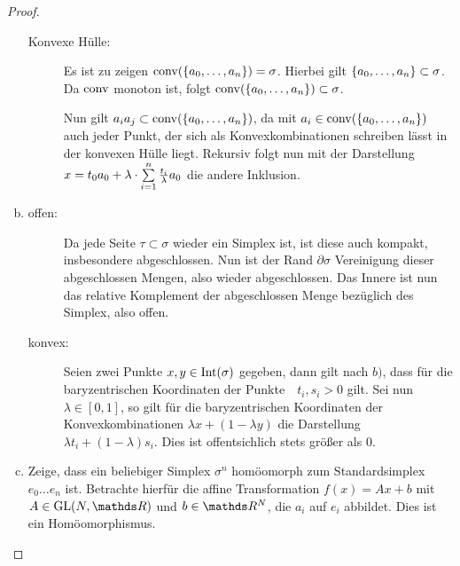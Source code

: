 \begin{Satz}
\begin{proof}
\begin{enumerate}[(a):]
\begin{description}
      \item[Konvexe Hülle:] Es ist zu zeigen
        $\conv(\sset{a_0,\ldots , a_n}) = \sigma$. Hierbei gilt
        $\sset{a_0,\ldots,a_n} \subset \sigma$. Da $\conv$ monoton
        ist, folgt $\conv(\sset{a_0,\ldots , a_n}) \subset \sigma$.
        
        Nun gilt $a_ia_j \subset \conv( \sset{a_0,\ldots , a_n} )$, da
        mit $a_i \in \ch$ auch jeder Punkt, der sich als
        Konvexkombinationen schreiben lässt in der konvexen Hülle
        liegt. Rekursiv folgt nun mit der Darstellung
        $x = t_0 a_0 + \lambda \cdot \sp{1}{n} \frac{t_i}{\lambda}
        a_0$ die andere Inklusion.
     \end{description}

   \item \begin{description}
     \item[offen:] Da jede Seite $\tau \subset \sigma$ wieder ein
       Simplex ist, ist diese auch kompakt, insbesondere
       abgeschlossen. Nun ist der Rand $\partial\sigma$ Vereinigung
       dieser abgeschlossen Mengen, also wieder abgeschlossen. Das
       Innere ist nun das relative Komplement der abgeschlossen Menge
       bezüglich des Simplex, also offen.
     \item[konvex:] Seien zwei Punkte $x,y \in \Int(\sigma)$ gegeben,
       dann gilt nach $b)$, dass für die baryzentrischen Koordinaten
       der Punkte~~$t_i,s_i >0$ gilt. Sei nun $\lambda \in [0,1]$, so
       gilt für die baryzentrischen Koordinaten der
       Konvexkombinationen $\lambda x + (1-\lambda y)$ die Darstellung
       $\lambda t_i + (1-\lambda)s_i$. Dies ist offentsichlich stets
       größer als $0$.
        \end{description}

      \item Zeige, dass ein beliebiger Simplex $\sigma^n$ homöomorph zum
        Standardsimplex $e_0\ldots e_n$ ist. Betrachte hierfür die
        affine Transformation $f(x) = Ax+b$ mit $A \in \GL(N,\R)$ und
        $b \in \R^N$, die $a_i$ auf $e_i$ abbildet. Dies ist ein
        Homöomorphismus.


\end{enumerate}
\end{proof}
\end{Satz}
